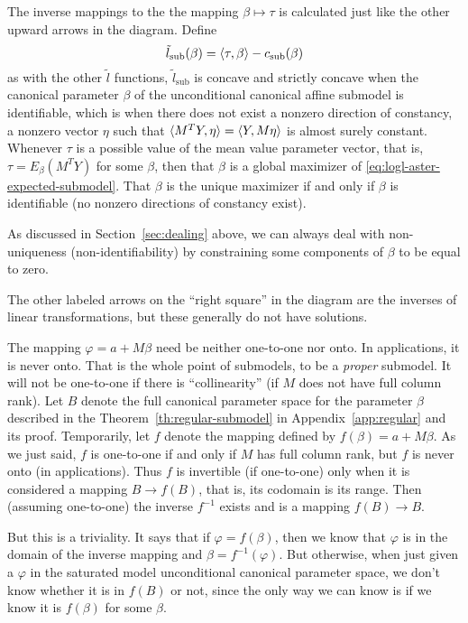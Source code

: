 The inverse mappings to the the mapping $\beta \mapsto \tau$ is calculated
just like the other upward arrows in the diagram.
Define
\begin{equation} \label{eq:logl-aster-expected-submodel}
   \tilde{l}_\text{sub}(\beta) = \langle \tau, \beta \rangle - c_\text{sub}(\beta)
\end{equation}
as with the other $\tilde{l}$ functions, $\tilde{l}_\text{sub}$ is concave
and strictly concave when the canonical parameter $\beta$ of the unconditional
canonical affine submodel is identifiable, which is when there does not
exist a nonzero direction of constancy, a nonzero vector $\eta$ such that
$\langle M^T Y, \eta \rangle = \langle Y, M \eta \rangle$ is almost surely constant.
Whenever $\tau$ is a possible value of the mean value parameter vector,
that is, $\tau = E_\beta(M^T Y)$ for some $\beta$, then that $\beta$
is a global maximizer of \eqref{eq:logl-aster-expected-submodel}.
That $\beta$ is the unique maximizer if and only if $\beta$ is identifiable
(no nonzero directions of constancy exist).

As discussed in Section~\ref{sec:dealing} above, we can always deal with
non-uniqueness (non-identifiability) by constraining some components of
$\beta$ to be equal to zero.

The other labeled arrows on the ``right square'' in the diagram are the
inverses of linear transformations, but these generally do not have solutions.

The mapping $\varphi = a + M \beta$ need be neither one-to-one nor onto.
In applications, it is never onto.  That is the whole point of submodels,
to be a \emph{proper} submodel.  It will not be one-to-one if there is
``collinearity'' (if $M$ does not have full column rank).  Let $B$ denote
the full canonical parameter space for the parameter $\beta$ described in
the Theorem~\ref{th:regular-submodel} in Appendix~\ref{app:regular} and its
proof.  Temporarily, let $f$ denote the mapping defined
by $f(\beta) = a + M \beta$.  As we just said, $f$ is one-to-one if and only
if $M$ has full column rank, but $f$ is never onto (in applications).
Thus $f$ is invertible (if one-to-one) only when it is considered a mapping
$B \to f(B)$, that is, its codomain is its range.  Then (assuming one-to-one)
the inverse $f^{-1}$ exists and is a mapping $f(B) \to B$.

But this is a triviality.  It says that if $\varphi = f(\beta)$, then we
know that $\varphi$ is in the domain of the inverse mapping
and $\beta = f^{-1}(\varphi)$.  But otherwise, when just given a $\varphi$
in the saturated model unconditional canonical parameter space, we don't know
whether it is in $f(B)$ or not, since the only way we can know is if we know
it is $f(\beta)$ for some $\beta$.

